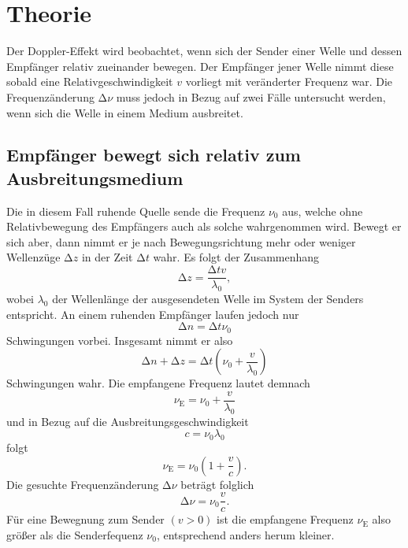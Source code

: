 \section{Theorie}
\label{sec:Theorie}
Der Doppler-Effekt wird beobachtet, wenn sich der Sender einer Welle und dessen Empfänger relativ zueinander bewegen.
Der Empfänger jener Welle nimmt diese sobald eine Relativgeschwindigkeit $v$ vorliegt mit veränderter Frequenz war.
Die Frequenzänderung $\increment \nu$ muss jedoch in Bezug auf zwei Fälle untersucht werden, wenn sich die Welle in einem Medium ausbreitet.\\
\subsection{Empfänger bewegt sich relativ zum Ausbreitungsmedium}
Die in diesem Fall ruhende Quelle sende die Frequenz $\nu_0$ aus, welche ohne Relativbewegung des Empfängers auch als solche wahrgenommen wird.
Bewegt er sich aber, dann nimmt er je nach Bewegungsrichtung mehr oder weniger Wellenzüge $\increment z$ in der Zeit $\increment t$ wahr.
Es folgt der Zusammenhang
\begin{equation}
  \increment z = \frac{\increment t v}{\lambda_0} \label{eqn:1},
\end{equation}
wobei $\lambda_0$ der Wellenlänge der ausgesendeten Welle im System der Senders entspricht.
An einem ruhenden Empfänger laufen jedoch nur
\begin{equation}
  \increment n = \increment t \nu_0 \label{eqn:2}
\end{equation}
Schwingungen vorbei.
Insgesamt nimmt er also
\begin{equation}
  \increment n + \increment z = \increment t \left( \nu_0 + \frac{v}{\lambda_0}\right) \label{eqn:3}
\end{equation}
Schwingungen wahr.
Die empfangene Frequenz lautet demnach
\begin{equation}
  \nu_{\text{E}} = \nu_0 + \frac{v}{\lambda_0} \label{eqn:4}
\end{equation}
und in Bezug auf die Ausbreitungsgeschwindigkeit
\begin{equation}
  \label{eqn:4.5}
  c = \nu_0 \lambda_0
\end{equation}
folgt
\begin{equation}
  \nu_{\text{E}} = \nu_0 \left(1 + \frac{v}{c} \right). \label{eqn:5}
\end{equation}
Die gesuchte Frequenzänderung $\increment \nu$ beträgt folglich
\begin{equation}
  \increment \nu = \nu_0 \frac{v}{c}. \label{eqn:5}
\end{equation}
Für eine Bewegnung zum Sender $(v>0)$ ist die empfangene Frequenz $\nu_{\text{E}}$ also größer als die Senderfequenz $\nu_0$, entsprechend anders herum kleiner.
